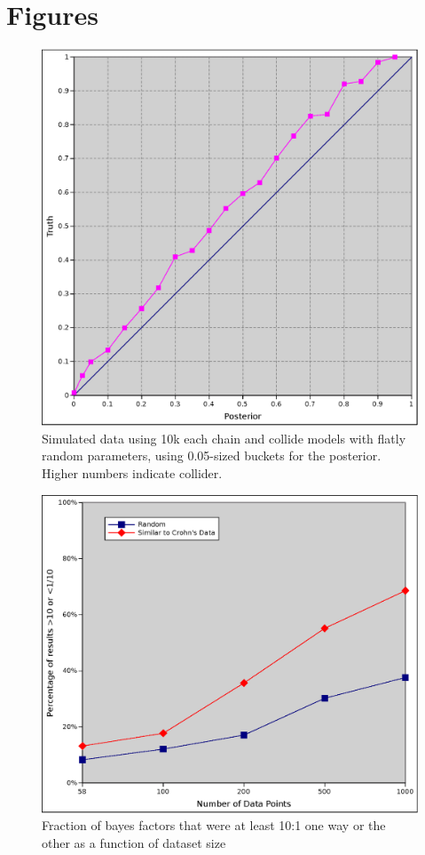 \documentclass[twocolumn,12pt]{article}
\begin{document}
\newpage
\onecolumn
\section{Figures}

\begin{figure}[h!]
  \includegraphics[width=\textwidth]{direction_platonic_58}
  \caption{Simulated data using 10k each chain and collide models with
    flatly random parameters, using 0.05-sized buckets for the
    posterior.  Higher numbers indicate collider.}
  \label{dir_pla58}
\end{figure}

\begin{figure}
  \includegraphics[width=\textwidth]{usefullness}
  \caption{Fraction of bayes factors that were at least 10:1 one way
    or the other as a function of dataset size}
  \label{dir_use}
\end{figure}
\end{document}
